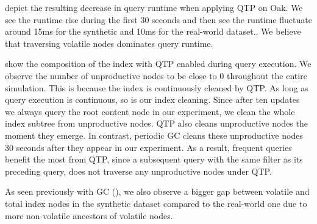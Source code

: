 \documentclass[abstracton,12pt]{scrartcl}
\theoremstyle{definition}
\begin{document}
 depict the
resulting decrease in query runtime when applying QTP on Oak. We see the runtime
rise during the first 30 seconds and then see the runtime fluctuate around
15ms for the synthetic and 10ms for the real-world dataset..
We believe that traversing volatile nodes dominates query runtime. 

 show the composition
of the index with QTP enabled during query execution. We observe the number of
unproductive nodes to be close to 0 throughout the entire simulation. This is
because the index is continuously cleaned by QTP. As long as query execution is
continuous, so is our index cleaning. Since after ten updates we always query the root content
node in our experiment, we clean the whole index subtree from unproductive nodes.
QTP also cleans unproductive nodes the moment they emerge. In contrast, periodic GC
cleans these unproductive nodes 30 seconds after they appear in our experiment.
As a result, frequent queries benefit the most from QTP, since a subsequent query with
the same filter as its preceding query, 
does not traverse any unproductive nodes under QTP.

As seen previously with GC (), 
we also observe a bigger gap between volatile and total
index nodes in the synthetic dataset compared to the real-world one due to
more non-volatile ancestors of volatile nodes.



\end{document}
